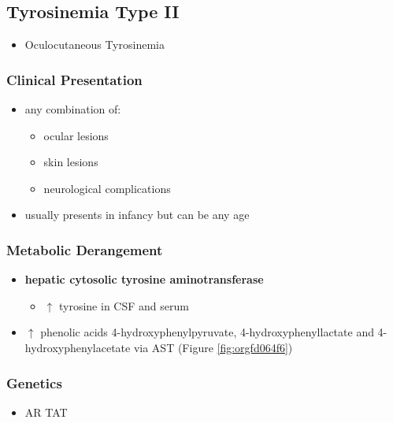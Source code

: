 \documentclass[12pt]{scrartcl}
\begin{document}
\subsection{Tyrosinemia Type II}
\label{sec:org16b5fe3}
\begin{itemize}
\item Oculocutaneous Tyrosinemia
\end{itemize}
\subsubsection{Clinical Presentation}
\label{sec:org3c967d2}
\begin{itemize}
\item any combination of: 
\begin{itemize}
\item ocular lesions
\item skin lesions
\item neurological complications
\end{itemize}
\item usually presents in infancy but can be any age
\end{itemize}

\subsubsection{Metabolic Derangement}
\label{sec:org6811a73}
\begin{itemize}
\item \textbf{hepatic cytosolic tyrosine aminotransferase}


\begin{itemize}
\item \(\uparrow\) tyrosine in CSF and serum
\end{itemize}
\item \(\uparrow\) phenolic acids 4-hydroxyphenylpyruvate,
4-hydroxyphenyllactate and 4-hydroxyphenylacetate via AST (Figure \ref{fig:orgfd064f6})
\end{itemize}

\subsubsection{Genetics}
\label{sec:orgceb2e54}
\begin{itemize}
\item AR TAT
\end{itemize}
\end{document}
